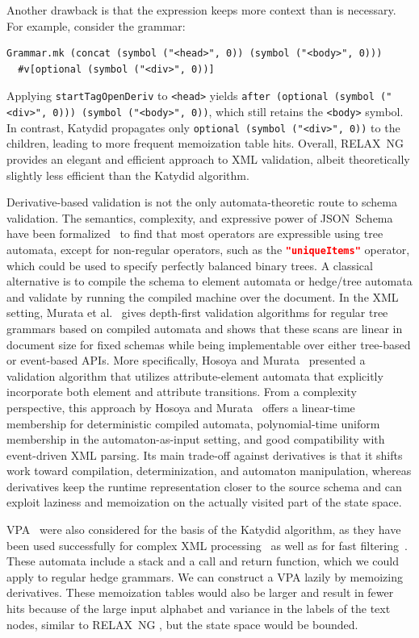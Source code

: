 \documentclass[runningheads]{llncs}
\newcommand{\RelaxNG}{%
  RELAX~NG\xspace%
}
\newcommand{\JSONSchema}{%
  JSON~Schema\xspace%
}
\newcommand{\uniqueItems}{%
  \lstinline[language=json]|"uniqueItems"|\xspace%
}
\newcommand{\VPA}{\ac{VPA}\xspace}
\newcommand{\XML}{\ac{XML}\xspace}
\begin{document}
Another drawback is that the expression keeps more context than is necessary.
For example, consider the grammar:
\begin{lstlisting}
Grammar.mk (concat (symbol ("<head>", 0)) (symbol ("<body>", 0)))
  #v[optional (symbol ("<div>", 0))]
\end{lstlisting}
Applying \lstinline{startTagOpenDeriv} to \lstinline{<head>} yields \lstinline{after (optional (symbol ("<div>", 0))) (symbol ("<body>", 0))}, which still retains the \lstinline{<body>} symbol.
In contrast, Katydid propagates only \lstinline{optional (symbol ("<div>", 0))} to the children, leading to more frequent memoization table hits.
Overall, \RelaxNG provides an elegant and efficient approach to \XML validation, albeit theoretically slightly less efficient than the Katydid algorithm.

Derivative-based validation is not the only automata-theoretic route to schema validation. 
The semantics, complexity, and expressive power of \JSONSchema have been formalized~\cite{jsonschemafoundations} to find that most operators are expressible using tree automata, except for non-regular operators, such as the \uniqueItems operator, which could be used to specify perfectly balanced binary trees.
A classical alternative is to compile the schema to element automata or hedge/tree automata and validate by running the compiled machine over the document. 
In the \XML setting, Murata et al.~\cite{murata2005taxonomy} gives depth-first validation algorithms for regular tree grammars based on compiled automata and shows that these scans are linear in document size for fixed schemas while being implementable over either tree-based or event-based APIs. 
More specifically, Hosoya and Murata~\cite{hosoya2002validation} presented a validation algorithm that utilizes attribute-element automata that explicitly incorporate both element and attribute transitions. 
From a complexity perspective, this approach by Hosoya and Murata~\cite{hosoya2002validation} offers a linear-time membership for deterministic compiled automata, polynomial-time uniform membership in the automaton-as-input setting, and good compatibility with event-driven \XML parsing. 
Its main trade-off against derivatives is that it shifts work toward compilation, determinization, and automaton manipulation, whereas derivatives keep the runtime representation closer to the source schema and can exploit laziness and memoization on the actually visited part of the state space.

\VPA~\cite{alur2004visibly} were also considered for the basis of the Katydid algorithm, as they have been used successfully for complex \XML processing~\cite{mozafari2012high} as well as for fast filtering~\cite{kumar2007visibly}.
These automata include a stack and a call and return function, which we could apply to regular hedge grammars.
We can construct a \VPA lazily by memoizing derivatives.
These memoization tables would also be larger and result in fewer hits because of the large input alphabet and variance in the labels of the text nodes, similar to \RelaxNG, but the state space would be bounded.
\end{document}
